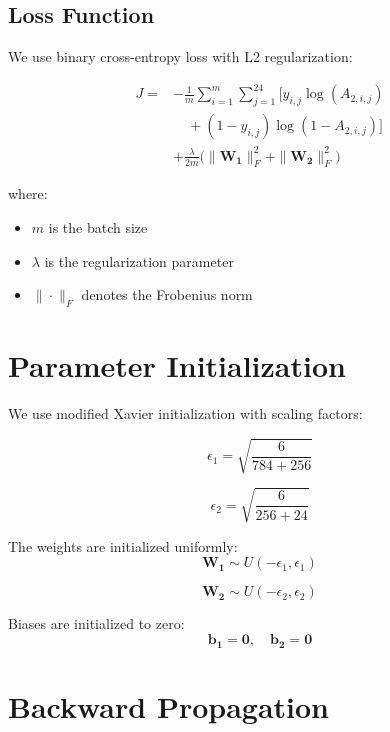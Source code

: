 \documentclass[times,final,english]{revdetua}
\begin{document}
\subsection{Loss Function}
We use binary cross-entropy loss with L2 regularization:

\begin{align}
J = & -\frac{1}{m} \sum_{i=1}^m \sum_{j=1}^{24} \big[ y_{i,j} \log(A_{2,i,j}) \nonumber \\
    & \quad + (1-y_{i,j}) \log(1-A_{2,i,j}) \big] \nonumber \\
    & + \frac{\lambda}{2m} \big( \|\mathbf{W_1}\|_F^2 + \|\mathbf{W_2}\|_F^2 \big)
\end{align}

where:
\begin{itemize}
    \item $m$ is the batch size
    \item $\lambda$ is the regularization parameter
    \item $\|\cdot\|_F$ denotes the Frobenius norm
\end{itemize}

\section{Parameter Initialization}

We use modified Xavier initialization with scaling factors:

\begin{equation}
\epsilon_1 = \sqrt{\frac{6}{784 + 256}}
\end{equation}

\begin{equation}
\epsilon_2 = \sqrt{\frac{6}{256 + 24}}
\end{equation}

The weights are initialized uniformly:
\begin{equation}
\mathbf{W_1} \sim U(-\epsilon_1, \epsilon_1)
\end{equation}

\begin{equation}
\mathbf{W_2} \sim U(-\epsilon_2, \epsilon_2)
\end{equation}

Biases are initialized to zero:
\begin{equation}
\mathbf{b_1} = \mathbf{0}, \quad \mathbf{b_2} = \mathbf{0}
\end{equation}

\section{Backward Propagation}
\end{document}

